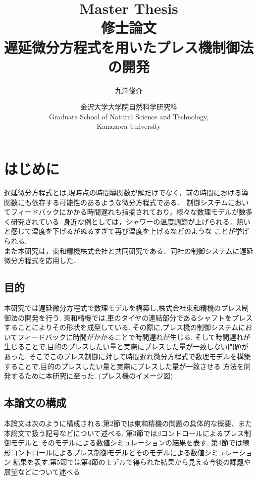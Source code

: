 \documentclass [dvipdfmx] {jsarticle}
\title{Master Thesis \\ \bigskip 
修士論文 \\ \bigskip 
{\bf  遅延微分方程式を用いたプレス機制御法の開発 }\\ \bigskip 
}
\author{九澤俊介}
\date{金沢大学大学院自然科学研究科 \\
Graduate School of Natural Science and Technology, \\
Kanazawa University}
\numberwithin{equation}{section}
\theoremstyle{definition} %
\theoremstyle{definition} %
\begin{document}
\maketitle
\thispagestyle{empty}
\setcounter{page}{-1}


\thispagestyle{empty}

\mbox{}\newpage 

\tableofcontents
\clearpage
\section{はじめに}
遅延微分方程式とは,現時点の時間導関数が解だけでなく，前の時間における導関数にも依存する可能性のあるような微分方程式である．
制御システムにおいてフィードバックにかかる時間遅れも指摘されており，様々な数理モデルが数多く研究されている.
身近な例としては，シャワーの温度調節が上げられる．熱いと感じて温度を下げるがぬるすぎて再び温度を上げるなどのような
ことが挙げられる.\\
また本研究は，東和精機株式会社と共同研究である．同社の制御システムに遅延微分方程式を応用した．
\subsection{目的}
本研究では遅延微分方程式で数理モデルを構築し,株式会社東和精機のプレス制御法の開発を行う.
東和精機では,車のタイヤの連結部分であるシャフトをプレスすることによりその形状を成型している.
その際に,プレス機の制御システムにおいてフィードバックに時間がかかることで時間遅れが生じる.
そして時間遅れが生じることで,目的のプレスしたい量と実際にプレスした量が一致しない問題があった.
そこでこのプレス制御に対して時間遅れ微分方程式で数理モデルを構築することで,目的のプレスしたい量と実際にプレスした量が一致させる
方法を開発するために本研究に至った.
(プレス機のイメージ図)


\subsection{本論文の構成}
本論文は次のように構成される.第2節では東和精機の問題の具体的な概要、また本論文で扱う記号などについて述べる.
第3節では$\beta$コントロールによるプレス制御モデルと
そのモデルによる数値シミュレーションの結果を表す.
第4節では線形コントロールによるプレス制御モデルとそのモデルによる数値シミュレーション
結果を表す.第5節では第4節のモデルで得られた結果から見える今後の課題や展望などについて述べる.
\end{document}
